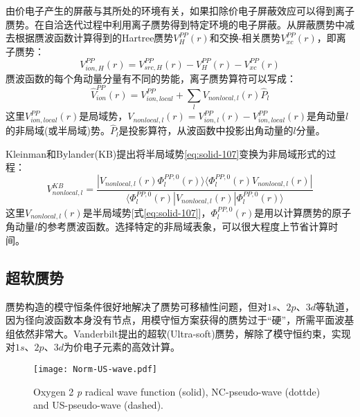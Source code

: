 由价电子产生的屏蔽与其所处的环境有关，如果扣除价电子屏蔽效应可以得到离子赝势。在自洽迭代过程中利用离子赝势得到特定环境的电子屏蔽。从屏蔽赝势中减去根据赝波函数计算得到的Hartree赝势$V_H^{PP}(r)$和交换-相关赝势$V_{xc}^{PP}(r)$，即离子赝势\cite{PRB43-1993_1991}：
$$V_{ion,H}^{PP}(r)=V_{src,H}^{PP}(r)-V_H^{PP}(r)-V_{xc}^{PP}(r)$$
赝波函数的每个角动量分量有不同的势能，离子赝势算符可以写成：
\begin{equation}
  \hat V_{ion}^{PP}(r)=V_{ion,local}^{PP}+\sum_lV_{nonlocal,l}(r)\hat P_l
  \label{eq:solid-107}
\end{equation}
这里$V_{ion,local}^{PP}(r)$是局域势，$V_{nonlocal,l}(r)=V_{ion,l}^{PP}(r)-V_{ion,local}^{PP}(r)$是角动量$l$的非局域(或半局域)势。$\hat P_l$是投影算符，从波函数中投影出角动量的$l$分量。

Kleinman和Bylander(KB)\cite{PRL48-1425_1982}提出将半局域势\eqref{eq:solid-107}变换为非局域形式的过程：
$$V_{nonlocal,l}^{KB}=\dfrac{|V_{nonlocal,l}(r)\Phi_l^{PP,0}(r)\rangle\langle\Phi_l^{PP,0}(r)V_{nonlocal,l}(r)|}{\langle\Phi_l^{PP,0}(r)|V_{nonlocal,l}(r)|\Phi_l^{PP,0}(r)\rangle}$$
这里$V_{nonlocal,l}(r)$是半局域势[式\eqref{eq:solid-107}]，$\Phi_l^{PP,0}(r)$是用以计算赝势的原子角动量$l$的参考赝波函数。选择特定的非局域表象，可以很大程度上节省计算时间。

\subsection{超软赝势}
赝势构造的模守恒条件很好地解决了赝势可移植性问题，但对$1s$、$2p$、$3d$等轨道，因为径向波函数本身没有节点，用模守恒方案获得的赝势过于“硬”，所需平面波基组依然非常大。\textrm{Vanderbilt}提出的超软\textrm{(Ultra-soft)}赝势\cite{PRB41-7892_1990}，解除了模守恒约束，实现对$1s$、$2p$、$3d$为价电子元素的高效计算。
\begin{figure}[h!]
\centering
\texttt{[image: Norm-US-wave.pdf]}
\caption{\small \textrm{Oxygen 2} \textit{p} \textrm{radical wave function (solid), NC-pseudo-wave (dottde) and US-pseudo-wave (dashed).}}%
\label{Norm-US-wave}
\end{figure}

